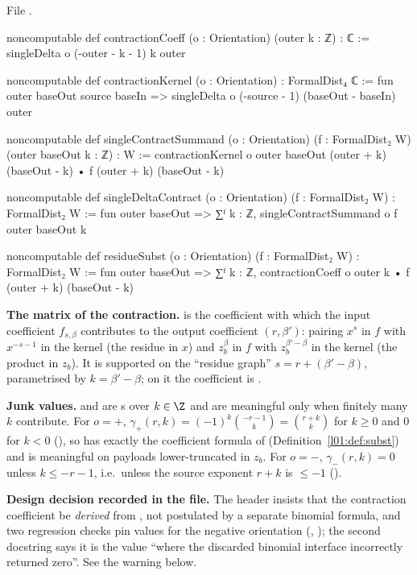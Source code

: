 \noindent File .
\begin{leancode}
noncomputable def contractionCoeff (o : Orientation) (outer k : ℤ) : ℂ :=
  singleDelta o (-outer - k - 1) k outer

noncomputable def contractionKernel (o : Orientation) : FormalDist₄ ℂ :=
  fun outer baseOut source baseIn =>
    singleDelta o (-source - 1) (baseOut - baseIn) outer

noncomputable def singleContractSummand (o : Orientation) (f : FormalDist₂ W)
    (outer baseOut k : ℤ) : W :=
  contractionKernel o outer baseOut (outer + k) (baseOut - k) •
    f (outer + k) (baseOut - k)

noncomputable def singleDeltaContract (o : Orientation) (f : FormalDist₂ W) :
    FormalDist₂ W :=
  fun outer baseOut => ∑ᶠ k : ℤ, singleContractSummand o f outer baseOut k

noncomputable def residueSubst (o : Orientation) (f : FormalDist₂ W) : FormalDist₂ W :=
  fun outer baseOut => ∑ᶠ k : ℤ,
    contractionCoeff o outer k • f (outer + k) (baseOut - k)
\end{leancode}

\begin{dictionary}
\textbf{The matrix of the contraction.}  is the coefficient with which the input
coefficient $f_{s,\beta}$ contributes to the output coefficient $(r,\beta')$: pairing $x^{s}$ in $f$ with $x^{-s-1}$ in the
kernel (the residue in $x$) and $z_b^{\beta}$ in $f$ with $z_b^{\beta'-\beta}$ in the kernel (the product in $z_b$). It is
supported on the ``residue graph'' $s = r+(\beta'-\beta)$, parametrised by $k = \beta'-\beta$; on it the coefficient is
.

\textbf{Junk values.}  and  are s over $k\in\Z$ and are meaningful only
when finitely many $k$ contribute. For $o = +$, $\gamma_+(r,k) = (-1)^k\binom{-r-1}{k} = \binom{r+k}{k}$ for $k\ge0$ and $0$ for
$k<0$ (), so  has exactly the coefficient formula of
 (Definition~\ref{l01:def:subst}) and is meaningful on payloads lower-truncated in $z_b$. For $o = -$, $\gamma_-(r,k)=0$
unless $k\le-r-1$, i.e.\ unless the source exponent $r+k$ is $\le-1$ ().

\textbf{Design decision recorded in the file.} The header insists that the contraction coefficient be \emph{derived} from
, not postulated by a separate binomial formula, and two regression checks pin values for the negative
orientation (, ); the second docstring says it is
the value ``where the discarded binomial interface incorrectly returned zero''. See the warning below.
\end{dictionary}

